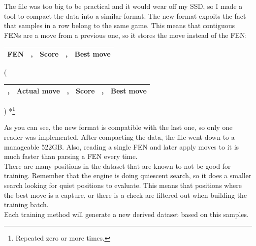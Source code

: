 
The file was too big to be practical and it would wear off my SSD, so I made a tool to compact the data into a similar format. The new format expoits the fact that samples in a row belong to the same game. This means that contiguous FENs are a move from a previous one, so it stores the move instead of the FEN:

\begin{center}
\begin{tabular}{|cp{0.0005cm}cp{0.0005cm}c|}
\hline
\textbf{FEN} & , & \textbf{Score} & , & \textbf{Best move} \\
\hline
\end{tabular}
(
\begin{tabular}{|p{0.0005cm}cp{0.0005cm}cp{0.0005cm}c|}
\hline
, & \textbf{Actual move} & , & \textbf{Score} & , & \textbf{Best move} \\
\hline
\end{tabular}
) *\footnote{Repeated zero or more times.}
\end{center}

As you can see, the new format is compatible with the last one, so only one reader was implemented. After compacting the data, the file went down to a manageable 522GB. Also, reading a single FEN and later apply moves to it is much faster than parsing a FEN every time. \\

There are many positions in the dataset that are known to not be good for training. Remember that the engine is doing quiescent search, so it does a smaller search looking for quiet positions to evaluate. This means that positions where the best move is a capture, or there is a check are filtered out when building the training batch. \\

Each training method will generate a new derived dataset based on this samples.


